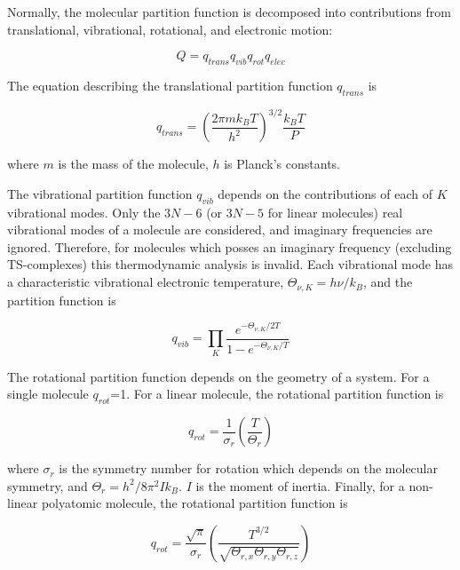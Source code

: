 Normally, the molecular partition function is decomposed into contributions from
translational, vibrational, rotational, and electronic motion:

\begin{equation}
  Q = q_{trans}q_{vib}q_{rot}q_{elec}
\end{equation}

\noindent The equation describing the translational partition function
$q_{trans}$ is

\begin{equation}
  q_{trans} = \left( \frac{2\pi m k_B T}{h^2} \right)^{3/2} \frac{k_BT}{P}
\end{equation}

\noindent where $m$ is the mass of the molecule, $h$ is Planck's constants.

The vibrational partition function $q_{vib}$ depends on the contributions of
each of $K$ vibrational modes. Only the $3N-6$ (or $3N-5$ for linear molecules)
real vibrational modes of a molecule are considered, and imaginary frequencies
are ignored. Therefore, for molecules which posses an imaginary frequency
(excluding TS-complexes) this thermodynamic analysis is invalid. Each
vibrational mode has a characteristic vibrational electronic temperature,
$\Theta_{\nu,K} = h\nu/k_B$, and the partition function is

\begin{equation}
  q_{vib} = \prod_K \frac{e^{-\Theta_{\nu,K}/2T}}{1 - e^{-\Theta_{\nu,K}/T}}
\end{equation}

The rotational partition function depends on the geometry of a system. For a
single molecule $q_{rot}$=1. For a linear molecule, the rotational partition
function is

\begin{equation}
  q_{rot} = \frac{1}{\sigma_r} \left(\frac{T}{\Theta_r}\right)
\end{equation}

\noindent where $\sigma_r$ is the symmetry number for rotation which depends on
the molecular symmetry, and $\Theta_r = h^2/8\pi^2Ik_B$. $I$ is the moment of
inertia. Finally, for a non-linear polyatomic molecule, the rotational partition
function is

\begin{equation}
  q_{rot} = \frac{\sqrt{\pi}}{\sigma_r}\left(\frac{T^{3/2}}{\sqrt{\Theta_{r,x}\Theta_{r,y}\Theta_{r,z}}}\right)
\end{equation}

